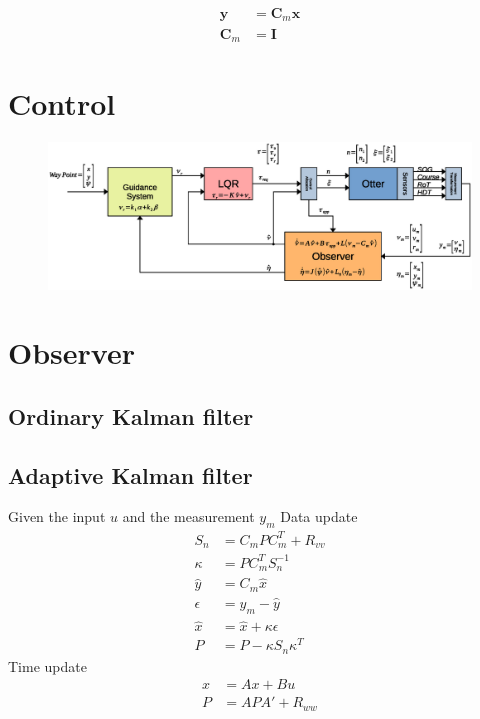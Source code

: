 \documentclass[12pt,a4]{article}
\begin{document}
\begin{align}
	\bm{y}   & = \bm{C}_m \bm{x} \\
	\bm{C}_m & = \bm{I}
\end{align}

\section{Control}
\begin{figure}[H]
	\includegraphics[width = \textwidth]{graphics/BlokDiagram.eps}
	\caption{}
	\label{}
\end{figure}

\section{Observer}

\subsection{Ordinary Kalman filter}

\subsection{Adaptive Kalman filter}
Given the input $u$ and the measurement $y_m$
Data update
\begin{align*}
	S_n      & = C_m P C_m^T + R_{vv}      \\
	\kappa   & = P C_m^T S_n^{-1}          \\
	\hat{y}  & = C_m \hat{x}               \\
	\epsilon & = y_m - \hat{y}             \\
	\hat{x}  & = \hat{x} + \kappa \epsilon \\
	P        & = P - \kappa S_n \kappa^T
\end{align*}
Time update
\begin{align*}
	x & = A x + B u       \\
	P & = A P A' + R_{ww}
\end{align*}
\end{document}
